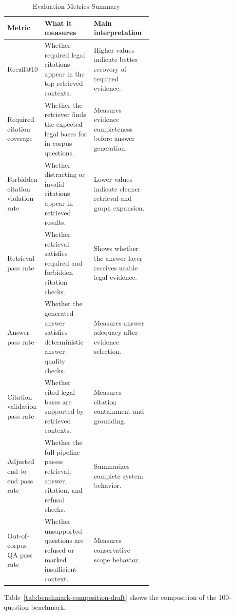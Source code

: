 \begin{table}[H]
  \centering
  \caption{Evaluation Metrics Summary}
  \label{tab:evaluation-metrics-draft}
  \small
  \begin{tabularx}{\linewidth}{@{}L{0.25\linewidth}L{0.34\linewidth}Y@{}}
    \toprule
    Metric & What it measures & Main interpretation \\
    \midrule
    Recall@10 & Whether required legal citations appear in the top retrieved contexts. & Higher values indicate better recovery of required evidence. \\
    Required citation coverage & Whether the retriever finds the expected legal bases for in-corpus questions. & Measures evidence completeness before answer generation. \\
    Forbidden citation violation rate & Whether distracting or invalid citations appear in retrieved results. & Lower values indicate cleaner retrieval and graph expansion. \\
    Retrieval pass rate & Whether retrieval satisfies required and forbidden citation checks. & Shows whether the answer layer receives usable legal evidence. \\
    Answer pass rate & Whether the generated answer satisfies deterministic answer-quality checks. & Measures answer adequacy after evidence selection. \\
    Citation validation pass rate & Whether cited legal bases are supported by retrieved contexts. & Measures citation containment and grounding. \\
    Adjusted end-to-end pass rate & Whether the full pipeline passes retrieval, answer, citation, and refusal checks. & Summarizes complete system behavior. \\
    Out-of-corpus QA pass rate & Whether unsupported questions are refused or marked insufficient-context. & Measures conservative scope behavior. \\
    \bottomrule
  \end{tabularx}
\end{table}

Table~\ref{tab:benchmark-composition-draft} shows the composition of the 100-question benchmark.

